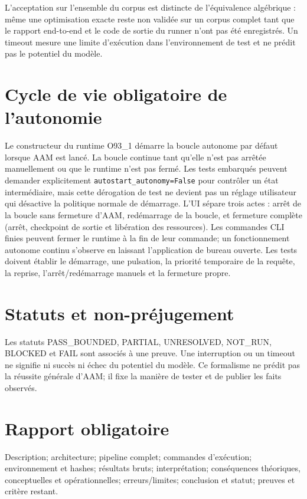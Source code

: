 \documentclass[11pt,a4paper]{article}
\begin{document}
L'acceptation sur l'ensemble du corpus est distincte de l'équivalence algébrique : même une optimisation exacte reste non validée sur un corpus complet tant que le rapport end-to-end et le code de sortie du runner n'ont pas été enregistrés. Un timeout mesure une limite d'exécution dans l'environnement de test et ne prédit pas le potentiel du modèle.

\section{Cycle de vie obligatoire de l'autonomie}
Le constructeur du runtime O93\_1 démarre la boucle autonome par défaut lorsque AAM est lancé. La boucle continue tant qu'elle n'est pas arrêtée manuellement ou que le runtime n'est pas fermé. Les tests embarqués peuvent demander explicitement \texttt{autostart\_autonomy=False} pour contrôler un état intermédiaire, mais cette dérogation de test ne devient pas un réglage utilisateur qui désactive la politique normale de démarrage. L'UI sépare trois actes : arrêt de la boucle sans fermeture d'AAM, redémarrage de la boucle, et fermeture complète (arrêt, checkpoint de sortie et libération des ressources). Les commandes CLI finies peuvent fermer le runtime à la fin de leur commande; un fonctionnement autonome continu s'observe en laissant l'application de bureau ouverte. Les tests doivent établir le démarrage, une pulsation, la priorité temporaire de la requête, la reprise, l'arrêt/redémarrage manuels et la fermeture propre.

\section{Statuts et non-préjugement}
Les statuts PASS\_BOUNDED, PARTIAL, UNRESOLVED, NOT\_RUN, BLOCKED et FAIL sont associés à une preuve. Une interruption ou un timeout ne signifie ni succès ni échec du potentiel du modèle. Ce formalisme ne prédit pas la réussite générale d'AAM; il fixe la manière de tester et de publier les faits observés.
\section{Rapport obligatoire}
Description; architecture; pipeline complet; commandes d'exécution; environnement et hashes; résultats bruts; interprétation; conséquences théoriques, conceptuelles et opérationnelles; erreurs/limites; conclusion et statut; preuves et critère restant.
\end{document}
